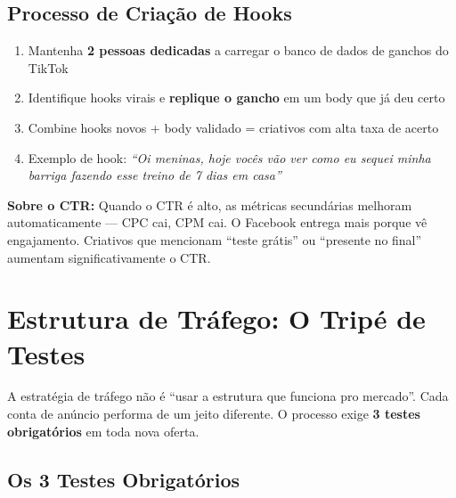 \documentclass[12pt, a4paper]{article}
\begin{document}
\subsection{Processo de Criação de Hooks}

\begin{enumerate}
    \item Mantenha \textbf{2 pessoas dedicadas} a carregar o banco de dados de ganchos do TikTok
    \item Identifique hooks virais e \textbf{replique o gancho} em um body que já deu certo
    \item Combine hooks novos + body validado = criativos com alta taxa de acerto
    \item Exemplo de hook: \textit{``Oi meninas, hoje vocês vão ver como eu sequei minha barriga fazendo esse treino de 7 dias em casa''}
\end{enumerate}

\textcolor{warningOrange}{\textbf{Sobre o CTR:}} Quando o CTR é alto, as métricas secundárias melhoram automaticamente --- CPC cai, CPM cai. O Facebook entrega mais porque vê engajamento. Criativos que mencionam ``teste grátis'' ou ``presente no final'' aumentam significativamente o CTR.

\needspace{10cm}

\section{Estrutura de Tráfego: O Tripé de Testes}

A estratégia de tráfego não é ``usar a estrutura que funciona pro mercado''. Cada conta de anúncio performa de um jeito diferente. O processo exige \textbf{3 testes obrigatórios} em toda nova oferta.

\subsection{Os 3 Testes Obrigatórios}
\end{document}
